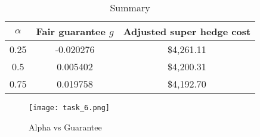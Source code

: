 \begin{table}[H]
    \centering
    \begin{tabular}{|c|c|c|}
\hline
         $\alpha$
&  Fair guarantee $g$
& Adjusted super hedge cost
\\
\hline
         0.25 
&  -0.020276
& \$4,261.11
\\
         0.5 
&  0.005402
& \$4,200.31
\\
         0.75 &  0.019758& \$4,192.70\\
\hline
    \end{tabular}
    \caption{Summary}
    \label{tab:summary_result}
\end{table}

\begin{figure}[H]
    \centering
    \texttt{[image: task\_6.png]}
    \caption{Alpha vs Guarantee}
    \label{fig:alpha_guarantee}
\end{figure}

